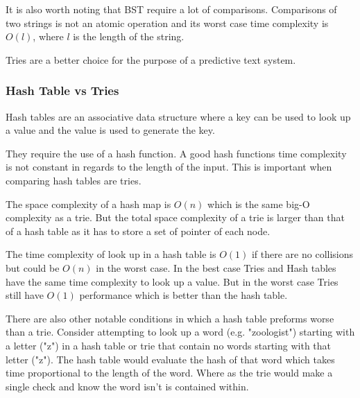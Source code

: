 \documentclass[10pt]{article} %
\begin{document}
			    It is also worth noting that BST require a lot of comparisons. Comparisons of two strings is not an atomic operation and its worst case time complexity is \begin{math}O(l)\end{math}, where \begin{math}l\end{math} is the length of the string.
			    
			    Tries are a better choice for the purpose of a predictive text system. 
			    
			\subsubsection{Hash Table vs Tries}
			    Hash tables are an associative data structure where a key can be used to look up a value and the value is used to generate the key.
			    
			    They require the use of a hash function. A good hash functions time complexity is not constant in regards to the length of the input. This is important when comparing hash tables are tries.
			    
			    The space complexity of a hash map is \begin{math} O(n) \end{math} which is the same big-O complexity as a trie. But the total space complexity of a trie is larger than that of a hash table as it has to store a set of pointer of each node.
			    
			    The time complexity of look up in a hash table is \begin{math} O(1) \end{math} if there are no collisions but could be \begin{math} O(n) \end{math} in the worst case. In the best case Tries and Hash tables have the same time complexity to look up a value. But in the worst case Tries still have \begin{math} O(1) \end{math} performance which is better than the hash table.
			    
			    There are also other notable conditions in which a hash table preforms worse than a trie. Consider attempting to look up a word (e.g. "zoologist") starting with a letter ("z") in a hash table or trie that contain no words starting with that letter ("z"). The hash table would evaluate the hash of that word which takes time proportional to the length of the word. Where as the trie would make a single check and know the word isn't is contained within.
			    
\end{document}
